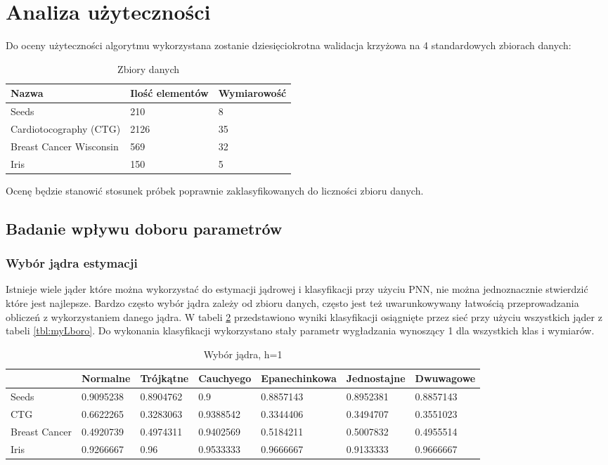 \documentclass[a4paper,12pt,twoside]{article}
\begin{document}
\section{Analiza użyteczności}
Do oceny użyteczności algorytmu wykorzystana zostanie dziesięciokrotna walidacja krzyżowa na 4 standardowych zbiorach danych:
\begin{table}[H]
\centering
\caption{Zbiory danych}
\label{zbiory}
\begin{tabular}{|l|l|l|}
\hline
Nazwa         & Ilość elementów & Wymiarowość \\ \hline
Seeds   & 210 & 8 \\ \hline
Cardiotocography (CTG)   & 2126 & 35 \\ \hline
Breast Cancer Wisconsin  & 569 & 32 \\ \hline
Iris  & 150 & 5 \\ \hline
\end{tabular}
\end{table}
Ocenę będzie stanowić stosunek próbek poprawnie zaklasyfikowanych do liczności zbioru danych. 
\subsection{Badanie wpływu doboru parametrów}
\subsubsection{Wybór jądra estymacji}
Istnieje wiele jąder które można wykorzystać do estymacji jądrowej i klasyfikacji przy użyciu PNN, nie można jednoznacznie stwierdzić które jest najlepsze. Bardzo często wybór jądra zależy od zbioru danych, często jest też uwarunkowywany łatwością przeprowadzania obliczeń z wykorzystaniem danego jądra. W tabeli \ref{kernelchoice} przedstawiono wyniki klasyfikacji osiągnięte przez sieć przy użyciu wszystkich jąder z tabeli \ref{tbl:myLboro}. Do wykonania klasyfikacji wykorzystano stały parametr wygładzania wynoszący 1 dla wszystkich klas i wymiarów.

\begin{table}[H]
\begin{adjustwidth}{-.5in}{-.5in}  
\centering
\caption{Wybór jądra, h=1}
\label{kernelchoice}
\begin{tabular}{|l|l|l|l|l|l|l|}
\hline
              & Normalne & Trójkątne & Cauchyego & Epanechinkowa & Jednostajne & Dwuwagowe\\ \hline
Seeds   & 0.9095238 & 0.8904762 & 0.9 & 0.8857143 & 0.8952381 & 0.8857143 \\ \hline
CTG     & 0.6622265 & 0.3283063 & 0.9388542 & 0.3344406 & 0.3494707 & 0.3551023 \\ \hline
Breast Cancer & 0.4920739 & 0.4974311 & 0.9402569 & 0.5184211 & 0.5007832 & 0.4955514 \\ \hline
Iris & 0.9266667 & 0.96 & 0.9533333 & 0.9666667 & 0.9133333 & 0.9666667\\ \hline
\end{tabular}
\end{adjustwidth}
\end{table}
\end{document}
